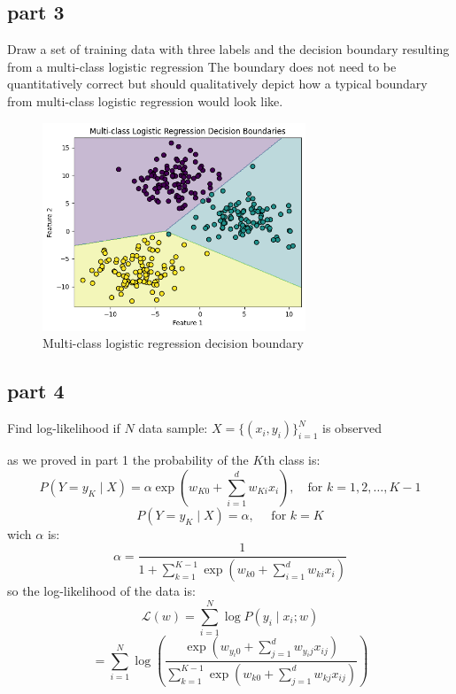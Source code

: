 \subsection{part 3}

Draw a set of training data with three labels and the decision boundary resulting from a multi-class logistic regression
The boundary does not need to be quantitatively correct but should qualitatively depict how a typical boundary from multi-class logistic regression would look like.

\begin{qsolve}
	\begin{qsolve}[]
		\begin{figure}[H]
			\centering
			\includegraphics[width=0.7\textwidth]{multi.png}
			\caption{Multi-class logistic regression decision boundary}
		\end{figure}
	\end{qsolve}
\end{qsolve}

\subsection{part 4}

Find log-likelihood if $N$ data sample: $X = \{(x_i, y_i)\}_{i = 1}^N$ is observed

\begin{qsolve}
	\begin{qsolve}[]
		as we proved in part 1 the probability of the $K$th class is:
		$$
		P(Y = y_K \mid X) = \alpha \exp \left( w_{K0} + \sum_{i=1}^d w_{Ki}x_i \right) , \quad \text{for } k = 1,2, \ldots, K-1
		$$
		$$
		P(Y = y_K \mid X) = \alpha,\quad \text{ for } k = K
		$$
		wich $\alpha$ is:
		$$
		\alpha = \frac{1}{1 + \sum_{k=1}^{K-1} \exp \left( w_{k0} + \sum_{i=1}^d w_{ki}x_i \right)}
		$$
		so the log-likelihood of the data is:
		$$
		\mathcal{L}(w) = \sum_{i=1}^{N} \log P(y_i \mid x_i; w)
		$$
		$$
		= \sum_{i=1}^{N} \log \left( \frac{\exp \left( w_{y_i0} + \sum_{j=1}^d w_{y_ij}x_{ij} \right)}{\sum_{k=1}^{K-1} \exp \left( w_{k0} + \sum_{j=1}^d w_{kj}x_{ij} \right)} \right)
		$$
	\end{qsolve}
\end{qsolve}


